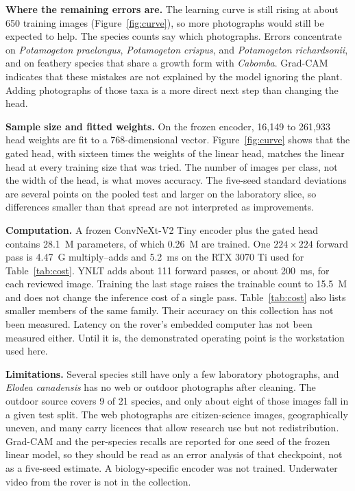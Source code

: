 \documentclass[final,3p,times,twocolumn]{elsarticle}
\begin{document}
\textbf{Where the remaining errors are.}
The learning curve is still rising at about 650 training images (Figure~\ref{fig:curve}), so more photographs would still be expected to help. The species counts say which photographs. Errors concentrate on \emph{Potamogeton praelongus}, \emph{Potamogeton crispus}, and \emph{Potamogeton richardsonii}, and on feathery species that share a growth form with \emph{Cabomba}. Grad-CAM indicates that these mistakes are not explained by the model ignoring the plant. Adding photographs of those taxa is a more direct next step than changing the head.

\textbf{Sample size and fitted weights.}
On the frozen encoder, 16{,}149 to 261{,}933 head weights are fit to a 768-dimensional vector. Figure~\ref{fig:curve} shows that the gated head, with sixteen times the weights of the linear head, matches the linear head at every training size that was tried. The number of images per class, not the width of the head, is what moves accuracy. The five-seed standard deviations are several points on the pooled test and larger on the laboratory slice, so differences smaller than that spread are not interpreted as improvements.

\textbf{Computation.}
A frozen ConvNeXt-V2 Tiny encoder plus the gated head contains 28.1~M parameters, of which 0.26~M are trained. One \(224\times 224\) forward pass is 4.47~G multiply--adds and 5.2~ms on the RTX 3070 Ti used for Table~\ref{tab:cost}. YNLT adds about 111 forward passes, or about 200~ms, for each reviewed image. Training the last stage raises the trainable count to 15.5~M and does not change the inference cost of a single pass. Table~\ref{tab:cost} also lists smaller members of the same family. Their accuracy on this collection has not been measured. Latency on the rover's embedded computer has not been measured either. Until it is, the demonstrated operating point is the workstation used here.

\textbf{Limitations.}
Several species still have only a few laboratory photographs, and \emph{Elodea canadensis} has no web or outdoor photographs after cleaning. The outdoor source covers 9 of 21 species, and only about eight of those images fall in a given test split. The web photographs are citizen-science images, geographically uneven, and many carry licences that allow research use but not redistribution. Grad-CAM and the per-species recalls are reported for one seed of the frozen linear model, so they should be read as an error analysis of that checkpoint, not as a five-seed estimate. A biology-specific encoder was not trained. Underwater video from the rover is not in the collection.
\end{document}
